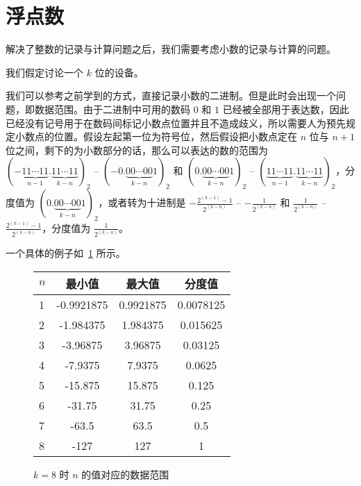 \section{浮点数}\label{sec:NumberSystemBasics/floating-point}
    解决了整数的记录与计算问题之后，我们需要考虑小数的记录与计算的问题。

    我们假定讨论一个 $k$ 位的设备。

    我们可以参考之前学到的方式，直接记录小数的二进制。但是此时会出现一个问题，即数据范围。由于二进制中可用的数码 $0$ 和 $1$ 已经被全部用于表达数，因此已经没有记号用于在数码间标记小数点位置并且不造成歧义，所以需要人为预先规定小数点的位置。假设左起第一位为符号位，然后假设把小数点定在 $n$ 位与 $n + 1$ 位之间，剩下的为小数部分的话，那么可以表达的数的范围为 $(-\underbrace{11 \cdots 11}_{n-1}.\underbrace{11 \cdots 11}_{k-n})_2$ -- $(-0.\underbrace{00 \cdots 00}_{k-n}1)_2$ 和 $(0.\underbrace{00 \cdots 00}_{k-n}1)_2$ -- $(\underbrace{11 \cdots 11}_{n-1}.\underbrace{11 \cdots 11}_{k-n})_2$，分度值为 $(0.\underbrace{00 \cdots 00}_{k-n}1)_2$，或者转为十进制是 $-\frac{2^{(k-1)}-1}{2^{(k-n)}}$ -- $-\frac{1}{2^{(k-n)}}$ 和 $\frac{1}{2^{(k-n)}}$ -- $\frac{2^{(k-1)}-1}{2^{(k-n)}}$，分度值为 $\frac{1}{2^{(k-n)}}$。

    一个具体的例子如~\ref{fig:NumberSystemBasics/floating-point/data-range} 所示。

    \begin{figure}
        \centering
        \begin{tabular}{lS[table-format=-3.7]S[table-format=-3.7]S[table-format=-3.7]}
            $n$ & 最小值     & 最大值    & 分度值    \\    & -0.9921875 & 0.9921875  & 0.0078125 \\
            2   & -1.984375  & 1.984375   & 0.015625  \\
            3   & -3.96875   & 3.96875    & 0.03125   \\
            4   & -7.9375    & 7.9375     & 0.0625    \\
            5   & -15.875    & 15.875     & 0.125     \\
            6   & -31.75     & 31.75      & 0.25      \\
            7   & -63.5      & 63.5       & 0.5       \\
            8   & -127       & 127        & 1         \\
        \end{tabular}
        \caption{$k = 8$ 时 $n$ 的值对应的数据范围}
        \label{fig:NumberSystemBasics/floating-point/data-range}
    \end{figure}

